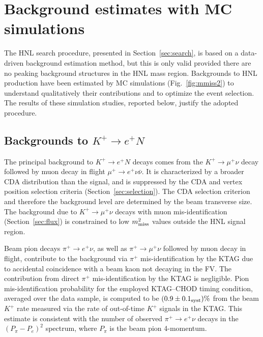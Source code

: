 \documentclass[11pt]{article}
\begin{document}

\section{Background estimates with MC simulations}
\label{sec:bkg}

The HNL search procedure, presented in Section~\ref{sec:search}, is based on a data-driven background estimation method, but this is only valid provided there are no peaking background structures in the HNL mass region. Backgrounds to HNL production have been estimated by MC simulations (Fig.~\ref{fig:mmiss2}) to understand qualitatively their contributions and to optimize the event selection. The results of these simulation studies, reported below, justify the adopted procedure.
%
%

\boldmath
\subsection{Backgrounds to $K^+\to e^+N$}
\label{sec:bkg-ke2}
\unboldmath

The principal background to $K^+\to e^+N$ decays comes from the $K^+\to\mu^+\nu$ decay followed by muon decay in flight $\mu^+\to e^+\nu\bar\nu$. It is characterized by a broader CDA distribution than the signal, and is suppressed by the CDA and vertex position selection criteria (Section~\ref{sec:selection}). The CDA selection criterion and therefore the background level are determined by the beam transverse size. The background due to $K^+\to\mu^+\nu$ decays with muon mis-identification (Section~\ref{sec:flux}) is constrained to low $m_{\rm miss}^2$ values outside the HNL signal region.

Beam pion decays $\pi^+\to e^+\nu$, as well as $\pi^+\to\mu^+\nu$ followed by muon decay in flight, contribute to the background via $\pi^+$ mis-identification by the KTAG due to accidental coincidence with a beam kaon not decaying in the FV. The contribution from direct $\pi^+$ mis-identification by the KTAG is negligible. Pion mis-identification probability for the employed KTAG--CHOD timing condition, averaged over the data sample, is computed to be $(0.9\pm0.1_{\rm syst})\%$ from the beam $K^+$ rate measured via the rate of out-of-time $K^+$ signals in the KTAG. This estimate is consistent with the number of observed $\pi^+\to e^+\nu$ decays in the $(P_\pi-P_e)^2$ spectrum, where $P_\pi$ is the beam pion 4-momentum.
\end{document}
